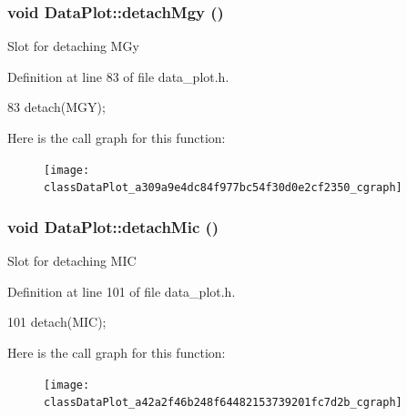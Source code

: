 \hypertarget{classDataPlot_a309a9e4dc84f977bc54f30d0e2cf2350}{
\subsubsection[{detachMgy}]{\setlength{\rightskip}{0pt plus 5cm}void DataPlot::detachMgy ()}}
\label{classDataPlot_a309a9e4dc84f977bc54f30d0e2cf2350}
Slot for detaching MGy 

Definition at line 83 of file data\_\-plot.h.




\begin{DoxyCode}
83 { detach(MGY); }
\end{DoxyCode}




Here is the call graph for this function:\nopagebreak
\begin{figure}[H]
\begin{center}
\leavevmode
\texttt{[image: classDataPlot\_a309a9e4dc84f977bc54f30d0e2cf2350\_cgraph]}
\end{center}
\end{figure}


\hypertarget{classDataPlot_a42a2f46b248f64482153739201fc7d2b}{
\subsubsection[{detachMic}]{\setlength{\rightskip}{0pt plus 5cm}void DataPlot::detachMic ()}}
\label{classDataPlot_a42a2f46b248f64482153739201fc7d2b}
Slot for detaching MIC 

Definition at line 101 of file data\_\-plot.h.




\begin{DoxyCode}
101 { detach(MIC); }
\end{DoxyCode}




Here is the call graph for this function:\nopagebreak
\begin{figure}[H]
\begin{center}
\leavevmode
\texttt{[image: classDataPlot\_a42a2f46b248f64482153739201fc7d2b\_cgraph]}
\end{center}
\end{figure}


